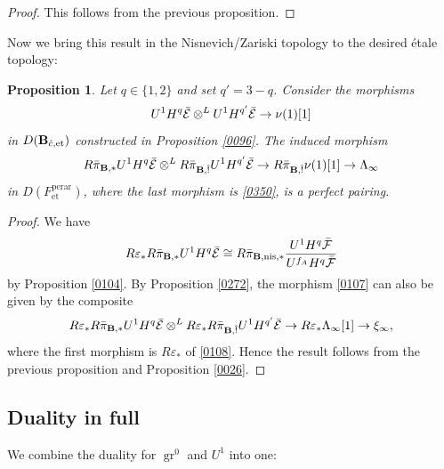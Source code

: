 \documentclass{amsart}
\newtheorem{Prop}[Thm]{Proposition}
\theoremstyle{remark}
\numberwithin{equation}{subsection}
\newcommand{\tensor}{\mathbin{\otimes}}
\newcommand{\et}{\mathrm{et}}
\newcommand{\perar}{\mathrm{perar}}
\newcommand{\alg}[1]{\mathbf{#1}}
\newcommand{\nis}{\mathrm{nis}}
\DeclareMathOperator{\gr}{gr}
\begin{document}
\begin{proof}
	This follows from the previous proposition.
\end{proof}

Now we bring this result in the Nisnevich/Zariski topology to the desired \'etale topology:

\begin{Prop} \label{0276}
	Let $q \in \{1, 2\}$ and set $q' = 3 - q$.
	Consider the morphisms
		\[
					U^{1} H^{q} \Bar{\mathcal{E}}
				\tensor^{L}
					U^{1} H^{q'} \Bar{\mathcal{E}}
			\to
				\nu(1)[1]
		\]
	in $D(\alg{B}_{\Hat{c}, \et})$ constructed in Proposition \ref{0096}.
	The induced morphism
		\begin{equation} \label{0108}
					R \Bar{\pi}_{\alg{B}, \ast} U^{1} H^{q} \Bar{\mathcal{E}}
				\tensor^{L}
					R \Bar{\pi}_{\alg{B}, \Hat{!}} U^{1} H^{q'} \Bar{\mathcal{E}}
			\to
				R \Bar{\pi}_{\alg{B}, \Hat{!}} \nu(1)[1]
			\to
				\Lambda_{\infty}
		\end{equation}
	in $D(F^{\perar}_{\et})$, where the last morphism is \eqref{0350},
	is a perfect pairing.
\end{Prop}

\begin{proof}
	We have
		\[
					R \varepsilon_{\ast}
					R \Bar{\pi}_{\alg{B}, \ast}
					U^{1} H^{q} \Bar{\mathcal{E}}
				\cong
					R \Bar{\pi}_{\alg{B}, \nis, \ast}
					\frac{
						U^{1} H^{q} \Bar{\mathcal{F}}
					}{
						U^{f_{A}} H^{q} \Bar{\mathcal{F}}
					}
		\]
	by Proposition \ref{0104}.
	By Proposition \ref{0272},
	the morphism \eqref{0107} can also be given by the composite
		\[
					R \varepsilon_{\ast}
					R \Bar{\pi}_{\alg{B}, \ast} U^{1} H^{q} \Bar{\mathcal{E}}
				\tensor^{L}
					R \varepsilon_{\ast}
					R \Bar{\pi}_{\alg{B}, \Hat{!}} U^{1} H^{q'} \Bar{\mathcal{E}}
			\to
				R \varepsilon_{\ast}
				\Lambda_{\infty}[1]
			\to
				\xi_{\infty},
		\]
	where the first morphism is $R \varepsilon_{\ast}$ of \eqref{0108}.
	Hence the result follows from the previous proposition and
	Proposition \ref{0026}.
\end{proof}


\subsection{Duality in full}
\label{0482}

We combine the duality for $\gr^{0}$ and $U^{1}$ into one:
\end{document}
